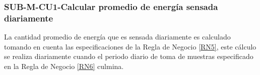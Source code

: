 \subsubsection{SUB-M-CU1-Calcular promedio de energía sensada diariamente}\label{SUB-M-CU1}
La cantidad promedio de energía que es sensada diariamente es calculado tomando en cuenta las especificaciones de la Regla de Negocio \ref{RN5}, este cálculo se realiza diariamente cuando el periodo diario de toma de muestras especificado en la Regla de Negocio \ref{RN6} culmina.
